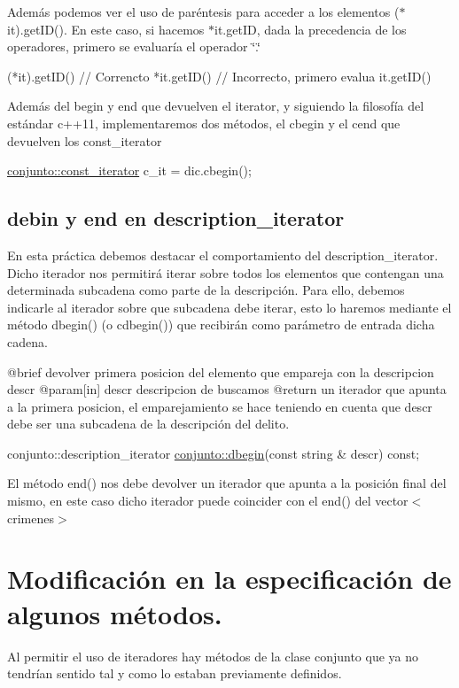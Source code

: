 Además podemos ver el uso de paréntesis para acceder a los elementos ($\ast$it).get\+I\+D(). En este caso, si hacemos $\ast$it.get\+I\+D, dada la precedencia de los operadores, primero se evaluaría el operador \char`\"{}.\char`\"{} 
\begin{DoxyCode}
(*it).getID() \textcolor{comment}{// Correncto}
*it.getID() \textcolor{comment}{// Incorrecto, primero evalua it.getID()}
\end{DoxyCode}


Además del begin y end que devuelven el iterator, y siguiendo la filosofía del estándar c++11, implementaremos dos métodos, el cbegin y el cend que devuelven los const\+\_\+iterator


\begin{DoxyCode}
\hyperlink{classconjunto_1_1const__iterator}{conjunto::const\_iterator} c\_it = dic.cbegin();
\end{DoxyCode}
\hypertarget{index_descr}{}\subsection{debin y end en description\+\_\+iterator}\label{index_descr}
En esta práctica debemos destacar el comportamiento del description\+\_\+iterator. Dicho iterador nos permitirá iterar sobre todos los elementos que contengan una determinada subcadena como parte de la descripción. Para ello, debemos indicarle al iterador sobre que subcadena debe iterar, esto lo haremos mediante el método dbegin() (o cdbegin()) que recibirán como parámetro de entrada dicha cadena.


\begin{DoxyCode}
@brief devolver primera posicion del elemento que empareja con la descripcion descr
@param[in] descr descripcion de buscamos
@\textcolor{keywordflow}{return} un iterador que apunta a la primera posicion, el emparejamiento se hace teniendo en cuenta que 
      descr debe ser una subcadena de la descripción del delito.

conjunto::description\_iterator \hyperlink{classconjunto_a67554c4c219143b596ba82ec29508e93}{conjunto::dbegin}(\textcolor{keyword}{const} \textcolor{keywordtype}{string} & descr) \textcolor{keyword}{const};
\end{DoxyCode}


El método end() nos debe devolver un iterador que apunta a la posición final del mismo, en este caso dicho iterador puede coincider con el end() del vector$<$crimenes$>$\hypertarget{index_modif}{}\section{Modificación en la especificación de algunos métodos.}\label{index_modif}
Al permitir el uso de iteradores hay métodos de la clase conjunto que ya no tendrían sentido tal y como lo estaban previamente definidos.

